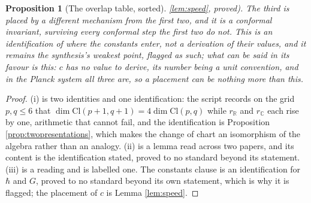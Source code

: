 \documentclass[11pt]{article}
\newtheorem{proposition}[theorem]{Proposition}
\theoremstyle{definition}
\newcommand{\Cl}{\mathrm{Cl}}
\newcommand{\R}{\mathbb{R}}
\newcommand{\C}{\mathbb{C}}
\begin{document}
\begin{proposition}[The overlap table, sorted]
\ref{lem:speed}, proved). The third is placed by a different mechanism from the first two, and it is a conformal invariant, surviving every conformal step the first two do not. This is an identification of \emph{where} the constants enter, not a derivation of their values, and it remains the synthesis's weakest point, flagged as such; what can be said in its favour is this: $c$ has no value to derive, its number being a unit convention, and in the Planck system all three are, so a placement can be nothing more than this.
\end{proposition}

\begin{proof}
(i) is two identities and one identification: the script records on the grid $p, q \leq 6$ that $\dim \Cl(p+1,q+1) = 4\dim\Cl(p,q)$ while $r_{\R}$ and $r_{\C}$ each rise by one, arithmetic that cannot fail, and the identification is Proposition \ref{prop:twopresentations}, which makes the change of chart an isomorphism of the algebra rather than an analogy. (ii) is a lemma read across two papers, and its content is the identification stated, proved to no standard beyond its statement. (iii) is a reading and is labelled one. The constants clause is an identification for $\hbar$ and $G$, proved to no standard beyond its own statement, which is why it is flagged; the placement of $c$ is Lemma \ref{lem:speed}.
\end{proof}
\end{document}
